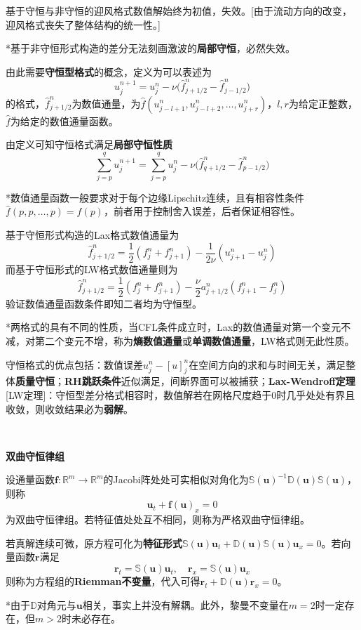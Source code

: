 \documentclass[a4paper,UTF8,fontset=windows]{ctexart}
\newcommand*{\bu}{\mathbf{u}}
\begin{document}
基于守恒与非守恒的迎风格式数值解始终为初值，失效。[由于流动方向的改变，迎风格式丧失了整体结构的统一性。]

*基于非守恒形式构造的差分无法刻画激波的\textbf{局部守恒}，必然失效。

由此需要\textbf{守恒型格式}的概念，定义为可以表述为
$$u_j^{n+1}=u_j^n-\nu\big(\hat{f}_{j+1/2}^n-\hat{f}_{j-1/2}^n\big)$$
的格式，$\hat{f}_{j+1/2}^n$为数值通量，为$\hat{f}(u_{j-l+1}^n,u_{j-l+2}^n,\dots,u_{j+r}^n)$，$l,r$为给定正整数，$\hat{f}$为给定的数值通量函数。

由定义可知守恒格式满足\textbf{局部守恒性质}
$$\sum_{j=p}^qu_j^{n+1}=\sum_{j=p}^qu_j^n-\nu\big(\hat{f}_{q+1/2}^n-\hat{f}_{p-1/2}^n\big)$$

*数值通量函数一般要求对于每个边缘Lipschitz连续，且有相容性条件$\hat{f}(p,p,\dots,p)=f(p)$，前者用于控制舍入误差，后者保证相容性。

基于守恒形式构造的Lax格式数值通量为
$$\hat{f}_{j+1/2}^n=\frac{1}{2}(f_j^n+f_{j+1}^n)-\frac{1}{2\nu}(u_{j+1}^n-u_j^n)$$
而基于守恒形式的LW格式数值通量则为
$$\hat{f}_{j+1/2}^n=\frac{1}{2}(f_j^n+f_{j+1}^n)-\frac{\nu}{2}a_{j+1/2}^n(f_{j+1}^n-f_j^n)$$
验证数值通量函数条件即知二者均为守恒型。

*两格式的具有不同的性质，当CFL条件成立时，Lax的数值通量对第一个变元不减，对第二个变元不增，称为\textbf{熵数值通量}或\textbf{单调数值通量}，LW格式则无此性质。

守恒格式的优点包括：数值误差$u_j^n-[u]_j^n$在空间方向的求和与时间无关，满足整体\textbf{质量守恒}；\textbf{RH跳跃条件}近似满足，间断界面可以被捕获；\textbf{Lax-Wendroff定理}[LW定理]：守恒型差分格式相容时，数值解若在网格尺度趋于0时几乎处处有界且收敛，则收敛结果必为\textbf{弱解}。

\

\textbf{双曲守恒律组}

设通量函数$\mathbf{f}:\mathbb{R}^m\to\mathbb{R}^m$的Jacobi阵处处可实相似对角化为$\mathbb{S}(\bu)^{-1}\mathbb{D}(\bu)\mathbb{S}(\bu)$，则称
$$\bu_t+\mathbf{f}(\bu)_x=0$$
为双曲守恒律组。若特征值处处互不相同，则称为严格双曲守恒律组。

若真解连续可微，原方程可化为\textbf{特征形式}$\mathbb{S}(\bu)\bu_t+\mathbb{D}(\bu)\mathbb{S}(\bu)\bu_x=0$。若向量函数$\mathbf{r}$满足
$$\mathbf{r}_t=\mathbb{S}(\bu)\bu_t,\quad\mathbf{r}_x=\mathbb{S}(\bu)\bu_x$$
则称为方程组的\textbf{Riemman不变量}，代入可得$\mathbf{r}_t+\mathbb{D}(\bu)\mathbf{r}_x=0$。

*由于$\mathbb{D}$对角元与$\bu$相关，事实上并没有解耦。此外，黎曼不变量在$m=2$时一定存在，但$m>2$时未必存在。
\end{document}
